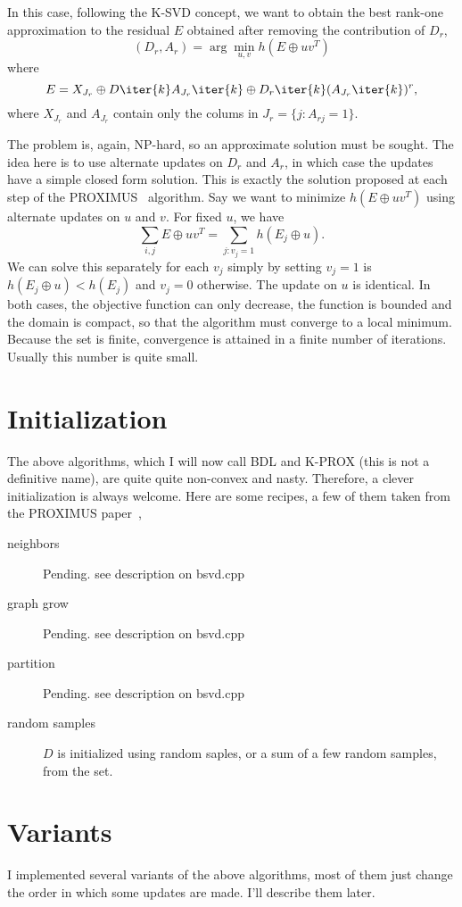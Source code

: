 \documentclass[a4paper,11pt]{article}
\begin{document}
In this case, following the K-SVD concept, we want to obtain the best rank-one approximation to the residual $E$ obtained after removing the contribution of $D_r$, 
\begin{equation}
(D_r,A_r) = \arg\min_{u,v} h(E \oplus uv^T)
\label{eq:bsvd1}
\end{equation}
where
\begin{equation}
E =  X_{J_r} \oplus D\iter{k}A_{J_r}\iter{k} \oplus D_r\iter{k}(A_{J_r}\iter{k})^r,
\label{eq:bsvd2}
\end{equation}
where $X_{J_r}$ and $A_{J_r}$ contain only the colums in $J_r = \{j: A_{rj} = 1 \}$.

The problem   is, again, NP-hard, so an approximate solution must be sought. The idea here is to use alternate updates on $D_r$ and $A_r$, in which case the updates have a simple closed form solution. This is exactly the solution proposed at each step of the PROXIMUS~\cite{proximus} algorithm. Say we want to minimize $h(E \oplus uv^T)$ using alternate updates on $u$ and $v$. For fixed $u$, we have
$$
\sum_{i,j} E \oplus uv^T = \sum_{j: v_j = 1} h(E_j \oplus u).
$$
We can solve this separately for each $v_j$ simply by setting $v_j = 1$ is $h(E_j \oplus u) < h(E_j)$ and $v_j=0$ otherwise. The update on $u$ is identical. In both cases, the objective function can only decrease, the function is bounded and the domain is compact, so that the algorithm must converge to a local minimum. Because the set is finite, convergence is attained in a finite number of iterations. Usually this number is quite small.


\section{Initialization}

The above algorithms, which I will now call BDL and K-PROX (this is not a definitive name), are quite quite non-convex and nasty. Therefore, a clever initialization is always welcome. Here are some recipes, a few of them  taken from the PROXIMUS paper~\cite{proximus},

\begin{description}
\item[neighbors] Pending. see description on bsvd.cpp
\item[graph grow] Pending. see description on bsvd.cpp
\item[partition] Pending. see description on bsvd.cpp
\item[random samples] $D$ is initialized using random saples, or a sum of a few random samples, from the set.
\end{description}

\section{Variants}

I implemented several variants of the above algorithms, most of them just change the order in which some updates are made. I'll describe them later.



\end{document}
